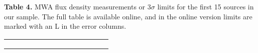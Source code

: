 \begin{onecolumn}
\begin{sidewaystable}
\vspace*{2cm}
{\bf Table 4.} MWA flux density measurements or $3\sigma$ limits for the first 15 sources in our sample. The full table is available online, and in the online version
limits are marked with an L in the error columns.\\

\setlength{\tabcolsep}{1mm}
  \label{t_seds}
    \begin{tabular}{llrrrrrrrrrrr}
    \hline
        
    \hline
    & & & & & & & & & & & & \\ 
    & & & & & & & & & & & & \\ 
    & & & & & & & & & & & & \\ 
    \hline
    
    \hline
    \end{tabular}
\end{sidewaystable}
\end{onecolumn}  
